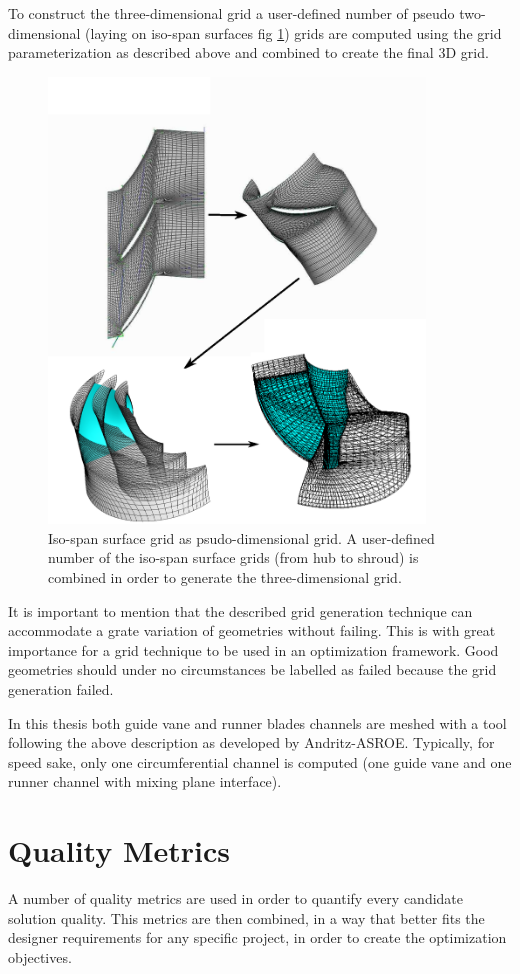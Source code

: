 To construct the three-dimensional grid a user-defined number of pseudo two-dimensional (laying on iso-span surfaces fig \ref{grid4}) grids are computed using the grid parameterization as described above and combined   to create the final 3D grid.

\begin{figure}[h!]
\centering
\includegraphics[width=100mm]{merid.eps} 
\caption{Iso-span surface grid as psudo-dimensional grid. A user-defined number of the iso-span surface grids (from hub to shroud) is combined in order to generate the three-dimensional grid.}
\label{grid4}
\end{figure}

It is important to mention that the described grid generation technique can accommodate a grate variation of geometries without failing. This is with great importance for a grid technique to be used in an optimization framework. Good geometries should under no circumstances be labelled as failed because the grid generation failed. 

In this thesis both guide vane and runner blades channels are meshed with a tool following the above description as developed by Andritz-ASROE. Typically, for speed sake, only one circumferential channel is computed (one guide vane and one runner channel with mixing plane interface).  

\section{Quality Metrics}
\label{metrics}
A number of quality metrics are used in order to quantify every candidate solution quality. This metrics are then combined, in a way that better fits the designer requirements for any specific project, in order to create the optimization objectives. 

